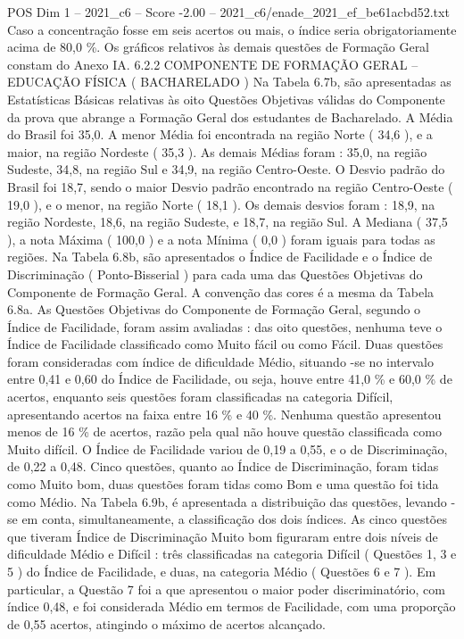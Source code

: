 \begin{textsample}{POS Dim 1 – 2021\_c6 – Score -2.00 – 2021\_c6/enade\_2021\_ef\_be61acbd52.txt}
Caso a concentração fosse em seis acertos ou mais, o índice seria obrigatoriamente acima de 80,0 \%.
Os gráficos relativos às demais questões de Formação Geral constam do Anexo IA. 6.2.2 COMPONENTE DE FORMAÇÃO GERAL – EDUCAÇÃO FÍSICA ( BACHARELADO ) Na Tabela 6.7b, são apresentadas as Estatísticas Básicas relativas às oito Questões Objetivas válidas do Componente da prova que abrange a Formação Geral dos estudantes de Bacharelado.
A Média do Brasil foi 35,0.
A menor Média foi encontrada na região Norte ( 34,6 ), e a maior, na região Nordeste ( 35,3 ).
As demais Médias foram : 35,0, na região Sudeste, 34,8, na região Sul e 34,9, na região Centro-Oeste.
O Desvio padrão do Brasil foi 18,7, sendo o maior Desvio padrão encontrado na região Centro-Oeste ( 19,0 ), e o menor, na região Norte ( 18,1 ).
Os demais desvios foram : 18,9, na região Nordeste, 18,6, na região Sudeste, e 18,7, na região Sul.
A Mediana ( 37,5 ), a nota Máxima ( 100,0 ) e a nota Mínima ( 0,0 ) foram iguais para todas as regiões.
Na Tabela 6.8b, são apresentados o Índice de Facilidade e o Índice de Discriminação ( Ponto-Bisserial ) para cada uma das Questões Objetivas do Componente de Formação Geral.
A convenção das cores é a mesma da Tabela 6.8a.
As Questões Objetivas do Componente de Formação Geral, segundo o Índice de Facilidade, foram assim avaliadas : das oito questões, nenhuma teve o Índice de Facilidade classificado como Muito fácil ou como Fácil.
Duas questões foram consideradas com índice de dificuldade Médio, situando -se no intervalo entre 0,41 e 0,60 do Índice de Facilidade, ou seja, houve entre 41,0 \% e 60,0 \% de acertos, enquanto seis questões foram classificadas na categoria Difícil, apresentando acertos na faixa entre 16 \% e 40 \%.
Nenhuma questão apresentou menos de 16 \% de acertos, razão pela qual não houve questão classificada como Muito difícil.
O Índice de Facilidade variou de 0,19 a 0,55, e o de Discriminação, de 0,22 a 0,48.
Cinco questões, quanto ao Índice de Discriminação, foram tidas como Muito bom, duas questões foram tidas como Bom e uma questão foi tida como Médio.
Na Tabela 6.9b, é apresentada a distribuição das questões, levando -se em conta, simultaneamente, a classificação dos dois índices.
As cinco questões que tiveram Índice de Discriminação Muito bom figuraram entre dois níveis de dificuldade Médio e Difícil : três classificadas na categoria Difícil ( Questões 1, 3 e 5 ) do Índice de Facilidade, e duas, na categoria Médio ( Questões 6 e 7 ).
Em particular, a Questão 7 foi a que apresentou o maior poder discriminatório, com índice 0,48, e foi considerada Médio em termos de Facilidade, com uma proporção de 0,55 acertos, atingindo o máximo de acertos alcançado.

\end{textsample}

